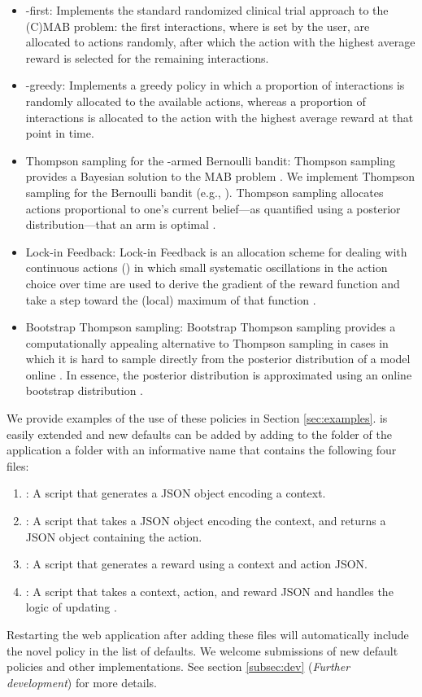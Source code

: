 \documentclass[nojss]{jss}
\begin{document}
\begin{itemize}
\item -first: Implements the standard randomized clinical trial approach to the (C)MAB problem: the first  interactions, where  is set by the user, are allocated to actions randomly, after which the action with the highest average reward is selected for the remaining interactions.
\item -greedy: Implements a greedy policy in which a proportion  of interactions is randomly allocated to the available actions, whereas a proportion of  interactions is allocated to the action with the highest average reward at that point in time.
\item Thompson sampling for the -armed Bernoulli bandit: Thompson sampling provides a Bayesian solution to the MAB problem \citep{thompson1933likelihood, Agrawal2011}. We implement Thompson sampling for the Bernoulli bandit (e.g., ). Thompson sampling allocates actions proportional to one's current belief---as quantified using a posterior distribution---that an arm is optimal \citep{Kaptein2014a}. 
\item Lock-in Feedback: Lock-in Feedback is an allocation scheme for dealing with continuous actions () in which small systematic oscillations in the action choice over time are used to derive the gradient of the reward function and take a step toward the (local) maximum of that function \citep[see][for details]{kaptein2016tracking, kaptein2016investigation}.
\item Bootstrap Thompson sampling: Bootstrap Thompson sampling provides a computationally appealing alternative to Thompson sampling in cases in which it is hard to sample directly from the posterior distribution of a model online \citep[see][]{Kaptein}. In essence, the posterior distribution is approximated using an online bootstrap distribution \citep{Owen2012}.
\end{itemize}
We provide examples of the use of these policies in Section \ref{sec:examples}.  is easily extended and new defaults can be added by adding to the  folder of the application a folder with an informative name that contains the following four files:
\begin{enumerate}
\item {}: A  script that generates a JSON object encoding a context. 
\item {}: A script that takes a JSON object encoding the context, and returns a JSON object containing the action.
\item {}: A script that generates a reward using a context and action JSON.
\item {}: A script that takes a context, action, and reward JSON and handles the logic of updating .
\end{enumerate}
Restarting the web application after adding these files will automatically include the novel policy in the list of defaults. We welcome submissions of new default policies and other implementations. See section \ref{subsec:dev} (\textit{Further development}) for more details.
\end{document}
